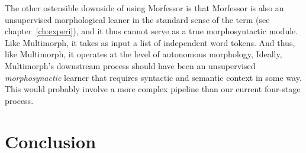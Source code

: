 The other ostensible downside of using Morfessor is that 
Morfessor is also an unsupervised morphological leaner in the 
standard sense of the term (see chapter~\ref{ch:experi}), 
and it thus cannot serve as a true morphosyntactic module.
Like Multimorph, it takes as input a list of independent word tokens.
And thus, like Multimorph, it operates at the level of autonomous morphology, 
Ideally, Multimorph’s downstream process should have been 
an unsupervised \emph{morphosynactic} learner that requires
syntactic and semantic context in some way. 
This would probably involve a more complex pipeline than our current  four-stage process.


\section{Conclusion}
\label{sec:concl-overall}
% 
%


